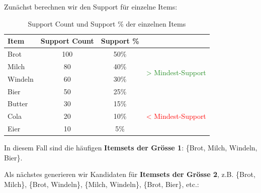 \begin{myexample}
\begin{table}[H]
        \caption{Beispielhafte Transaktionsdaten}
    \end{table}
    Zunächst berechnen wir den Support für einzelne Items:
    \begin{table}[H]
        \centering
        \begin{tabular}{lccl}
            \textbf{Item} & \textbf{Support Count} & \textbf{Support} \% &                                                             \\
            \midrule
            Brot          & 100                    & 50\%                & \multirow{4}{*}{\textcolor{ForestGreen}{> Mindest-Support}} \\
            Milch         & 80                     & 40\%                &                                                             \\
            Windeln       & 60                     & 30\%                &                                                             \\
            Bier          & 50                     & 25\%                &                                                             \\\midrule
            Butter        & 30                     & 15\%                & \multirow{4}{*}{\textcolor{red}{< Mindest-Support}}         \\
            Cola          & 20                     & 10\%                &                                                             \\
            Eier          & 10                     & 5\%                 &                                                             \\
        \end{tabular}
        \caption{Support Count und Support \% der einzelnen Items}
    \end{table}
    In diesem Fall sind die häufigen \textbf{Itemsets der Grösse 1}: \{Brot, Milch, Windeln, Bier\}.

    Als nächstes generieren wir Kandidaten für \textbf{Itemsets der Grösse 2}, z.B. \{Brot, Milch\}, \{Brot, Windeln\}, \{Milch, Windeln\}, \{Brot, Bier\}, etc.:


\end{myexample}
